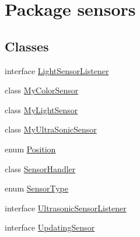 \hypertarget{namespacesensors}{\section{Package sensors}
\label{namespacesensors}
}
\subsection*{Classes}
\begin{DoxyCompactItemize}
\item 
interface \hyperlink{interfacesensors_1_1_light_sensor_listener}{Light\-Sensor\-Listener}
\item 
class \hyperlink{classsensors_1_1_my_color_sensor}{My\-Color\-Sensor}
\item 
class \hyperlink{classsensors_1_1_my_light_sensor}{My\-Light\-Sensor}
\item 
class \hyperlink{classsensors_1_1_my_ultra_sonic_sensor}{My\-Ultra\-Sonic\-Sensor}
\item 
enum \hyperlink{enumsensors_1_1_position}{Position}
\item 
class \hyperlink{classsensors_1_1_sensor_handler}{Sensor\-Handler}
\item 
enum \hyperlink{enumsensors_1_1_sensor_type}{Sensor\-Type}
\item 
interface \hyperlink{interfacesensors_1_1_ultrasonic_sensor_listener}{Ultrasonic\-Sensor\-Listener}
\item 
interface \hyperlink{interfacesensors_1_1_updating_sensor}{Updating\-Sensor}
\end{DoxyCompactItemize}
